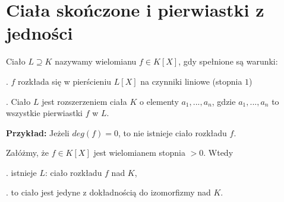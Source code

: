 \section{Ciała skończone i pierwiastki z jedności}

\begin{bbox}
Ciało $L\supseteq K$ nazywamy  wielomianu $f\in K[X]$, gdy spełnione są warunki:

. $f$ rozkłada się w pierścieniu $L[X]$ na czynniki liniowe (stopnia $1$)

. Ciało $L$ jest rozszerzeniem ciała $K$ o elementy $a_1,...,a_n$, gdzie $a_1,...,a_n$ to wszystkie pierwiastki $f$ w $L$.
\end{bbox}

\textbf{Przykład:} Jeżeli $deg(f)=0$, to nie istnieje ciało rozkładu $f$.

\begin{conclusion}
    \label{wniosek:2.1}
    Załóżmy, że $f\in K[X]$ jest wielomianem stopnia $>0$. Wtedy

. istnieje $L$: ciało rozkładu $f$ nad $K$,

. to ciało jest jedyne z dokładnością do izomorfizmy nad $K$.
\end{conclusion}

